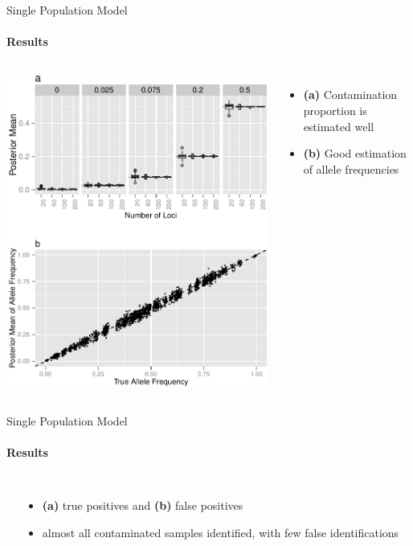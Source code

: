 \documentclass[letter,graphicx]{beamer}
\begin{document}
\begin{frame}{Single Population Model}
\framesubtitle{Results}
\begin{columns}[c]

\column{2.75in}
\includegraphics[width=.9\textwidth]{images/rho_and_allele.pdf}

\column{2in}
\begin{itemize}
\item \textbf{(a)} Contamination proportion is estimated well
\vspace{2.3cm}
\item \textbf{(b)} Good estimation of allele frequencies
\end{itemize}

\end{columns}
\end{frame} 

\begin{frame}{Single Population Model}
\framesubtitle{Results}
\begin{columns}[c]
\column{2.75in}
\begin{table}
\begin{scriptsize}
\hrule\hrule
\mbox{}\\

\hrule
\end{scriptsize}
\end{table}

\column{2in}
\begin{itemize}
\item \textbf{(a)} true positives and \textbf{(b)} false positives
\vspace{5mm}
\item almost all contaminated samples identified, with few false identifications
\end{itemize}
\end{columns}
\end{frame}
\end{document}

